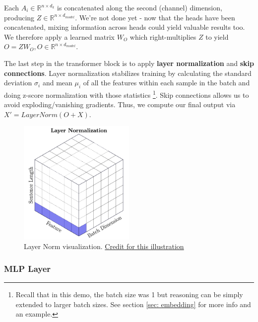\documentclass[12pt]{article}
\begin{document}
Each $A_i \in \mathbb{R}^{n \times d_{k}}$ is concatenated along the second (channel) dimension, producing $Z \in \mathbb{R}^{n \times d_{model}}$. We're not done yet - now that the heads have been concatenated, mixing information across heads could yield valuable results too. We therefore apply a learned matrix $W_O$ which right-multiplies $Z$ to yield $O = ZW_O, O \in \mathbb{R}^{n \times d_{model}}$. 

The last step in the transformer block is to apply \textbf{layer normalization} and \textbf{skip connections}. Layer normalization stabilizes training by calculating the standard deviation $\sigma_i$ and mean $\mu_i$ of all the features within each sample in the batch and doing z-score normalization with those statistics \footnote{Recall that in this demo, the batch size was 1 but reasoning can be simply extended to larger batch sizes. See section \ref{sec: embedding} for more info and an example.}. Skip connections allows us to avoid exploding/vanishing gradients. Thus, we compute our final output via $X' = LayerNorm(O + X)$. 

\begin{figure}[H]
    \centering
    \includegraphics[width=0.5\textwidth]{../media/layernorm.png}
    \caption{Layer Norm visualization. \href{https://proceedings.mlr.press/v119/shen20e/shen20e.pdf}{Credit for this illustration}}
    \label{fig:norms}
\end{figure}



\subsubsection{MLP Layer}

\end{document}
